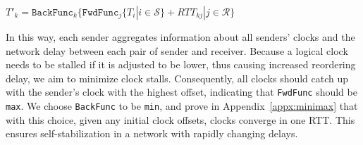 {{\small{$T'_k  = \texttt{BackFunc}_k \{ \texttt{FwdFunc}_j \{ T_i | i \in \mathcal{S} \} + RTT_{kj} | j \in \mathcal{R} \}$}}

In this way, each sender aggregates information about all senders' clocks and the network delay between each pair of sender and receiver.
Because a logical clock needs to be stalled if it is adjusted to be lower, thus causing increased reordering delay, we aim to minimize clock stalls.
Consequently, all clocks should catch up with the sender's clock with the highest offset, indicating that \texttt{FwdFunc} should be \texttt{max}.
We choose \texttt{BackFunc} to be \texttt{min}, and prove in Appendix~\ref{appx:minimax} that with this choice, given any initial clock offsets, clocks converge in one RTT.
This ensures self-stabilization in a network with rapidly changing delays.

\iffalse
\begin{figure}[t]
\centering


\end{figure}}
